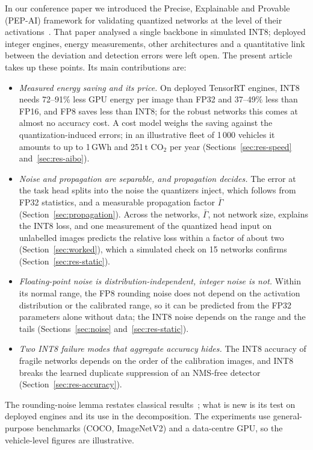\documentclass[pdflatex,sn-mathphys-num]{sn-jnl}%
\theoremstyle{thmstyleone}%
\theoremstyle{thmstyletwo}%
\theoremstyle{thmstylethree}%
\begin{document}
In our conference paper we introduced the Precise, Explainable and Provable (PEP-AI) framework for validating quantized networks at the level of their activations~\cite{menyhart2026citds}. That paper analysed a single backbone in simulated INT8; deployed integer engines, energy measurements, other architectures and a quantitative link between the deviation and detection errors were left open. The present article takes up these points. Its main contributions are:
\begin{itemize}
\item \emph{Measured energy saving and its price.} On deployed TensorRT engines, INT8 needs 72--91\% less GPU energy per image than FP32 and 37--49\% less than FP16, and FP8 saves less than INT8; for the robust networks this comes at almost no accuracy cost. A cost model weighs the saving against the quantization-induced errors; in an illustrative fleet of 1\,000 vehicles it amounts to up to 1\,GWh and 251\,t CO$_2$ per year (Sections~\ref{sec:res-speed} and~\ref{sec:res-aibo}).
\item \emph{Noise and propagation are separable, and propagation decides.} The error at the task head splits into the noise the quantizers inject, which follows from FP32 statistics, and a measurable propagation factor $\bar\Gamma$ (Section~\ref{sec:propagation}). Across the networks, $\bar\Gamma$, not network size, explains the INT8 loss, and one measurement of the quantized head input on unlabelled images predicts the relative loss within a factor of about two (Section~\ref{sec:worked}), which a simulated check on 15 networks confirms (Section~\ref{sec:res-static}).
\item \emph{Floating-point noise is distribution-independent, integer noise is not.} Within its normal range, the FP8 rounding noise does not depend on the activation distribution or the calibrated range, so it can be predicted from the FP32 parameters alone without data; the INT8 noise depends on the range and the tails (Sections~\ref{sec:noise} and~\ref{sec:res-static}).
\item \emph{Two INT8 failure modes that aggregate accuracy hides.} The INT8 accuracy of fragile networks depends on the order of the calibration images, and INT8 breaks the learned duplicate suppression of an NMS-free detector (Section~\ref{sec:res-accuracy}).
\end{itemize}
The rounding-noise lemma restates classical results~\cite{banner2019aciq,kuzmin2022fp8}; what is new is its test on deployed engines and its use in the decomposition. The experiments use general-purpose benchmarks (COCO, ImageNetV2) and a data-centre GPU, so the vehicle-level figures are illustrative.
\end{document}
